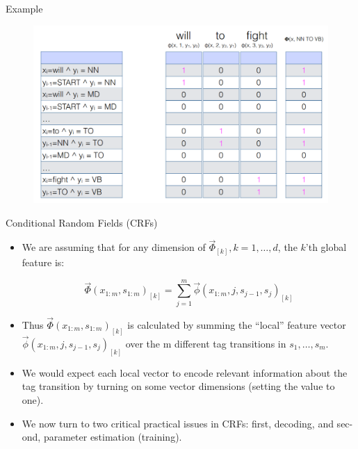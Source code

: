 \documentclass[handout]{beamer}
\begin{document}
\begin{frame}{Example}
  \begin{figure}[h]
        	\includegraphics[scale = 0.26]{pics/CRF3.png}
        \end{figure}
        
\end{frame}


\begin{frame}{Conditional Random Fields (CRFs)}
\begin{scriptsize}

\begin{itemize}
\item We are assuming that for any dimension of $\vec{\Phi}_{[k]}, k= 1, \dots, d$, the $k$'th global feature is:

\begin{displaymath}
 \vec{\Phi}(x_{1:m},s_{1:m})_{[k]} = \sum_{j=1}^{m} \vec{\phi}(x_{1:m},j,s_{j-1},s_j)_{[k]} 
\end{displaymath}

\item Thus $\vec{\Phi}(x_{1:m},s_{1:m})_{[k]}$ is calculated by summing the ``local'' feature vector $\vec{\phi}(x_{1:m},j,s_{j-1},s_j)_{[k]}$  over the m different tag transitions in $s_1,\dots,s_m$.


\item We would expect each local vector to encode relevant information about the tag transition by turning on some vector dimensions (setting the value to one).

\item We now turn to two critical practical issues in CRFs: first, decoding, and sec-
ond, parameter estimation (training).

\end{itemize}

\end{scriptsize}
\end{frame}
\end{document}
